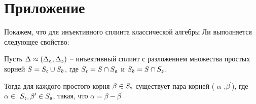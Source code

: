 

\section*{Приложение}
\label{sec:appendix}
Покажем, что для инъективного сплинта классической алгебры Ли выполняется следующее свойство:
\begin{Prop}
Пусть $\Delta \approx (\Delta _{\mathfrak{a}},\Delta _{\mathfrak{s}})$ -- инъективный сплинт с разложением множества простых корней  $S=S_{\frak{c}}\cup S_{\frak{d}}$, где $S_{\frak{c}}=S\cap S_{\mathfrak{a}}$ и $S_{\frak{d}}=S\cap S_{\mathfrak{s}}$.

Тогда для каждого простого корня  $\beta \in S_{\mathfrak{s}}$ существует пара корней  ( $\alpha $ ,$\beta ^{\prime }$), где $\alpha \in $ $S_{\frak{c}},\beta ^{\prime }\in S_{\mathfrak{s}}$, такая, что $\alpha =\beta-\beta ^{\prime }$
\end{Prop}
